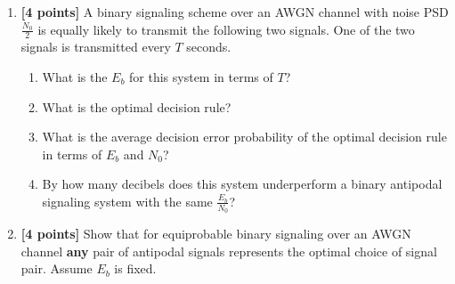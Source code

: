 \documentclass[10pt]{report}
\begin{document}
\begin{enumerate}
\begin{enumerate}
  \end{enumerate}
  \item \textbf{[4 points]} A binary signaling scheme over an AWGN channel with noise PSD $\frac{N_0}{2}$ is equally likely to transmit the following two signals. One of the two signals is transmitted every $T$ seconds.
 \begin{figure}[h]
    \centering
    \centering
  \end{figure}
  \begin{enumerate}
    \item What is the $E_b$ for this system in terms of $T$?
    \item What is the optimal decision rule?
    \item What is the average decision error probability of the optimal decision rule in terms of $E_b$ and $N_0$?
    \item By how many decibels does this system underperform a binary antipodal signaling system with the same $\frac{E_b}{N_0}$?
  \end{enumerate}
    \item \textbf{[4 points]} Show that for equiprobable binary signaling over an AWGN channel \textbf{any} pair of antipodal signals represents the optimal choice of signal pair. Assume $E_b$ is fixed.
\end{enumerate}
\end{document}
